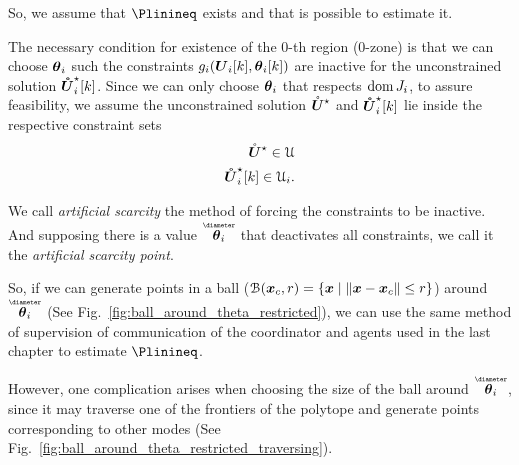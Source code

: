 \documentclass[../main.tex]{subfiles}
\begin{document}
So, we assume that $\Plinineq$ exists and that is possible to estimate it.

The necessary condition for existence of the $0$-th region ($0$-zone) is that we can choose $\boldsymbol{\theta}_{i}$ such the constraints $\inequalityfunction$ are inactive for the unconstrained solution $\optuncUik$.
Since we can only choose $\boldsymbol{\theta}_{i}$ that respects $\operatorname{dom} J_{i}$, to assure feasibility, we assume the unconstrained solution ${\mathring{\boldsymbol{U}}^{\star}}$ and $\optuncUik$ lie inside
the respective constraint sets
\begin{align}
  \optuncU\in\set{U}\\
  \optuncUik\in\set{U}_{i}.
\end{align}


We call \emph{artificial scarcity} the method of forcing the constraints to be inactive.
And supposing there is a value $\thetairestricted$ that deactivates all constraints, we call it the \emph{artificial scarcity point}.

So, if we can generate points in a ball ($\mathcal{B}(\boldsymbol{x}_{c},r)=\{\boldsymbol{x}\mid\left\lVert\boldsymbol{x}-\boldsymbol{x}_{c}\right\rVert\leq r\}$) around $\thetairestricted$ (See Fig.~\ref{fig:ball_around_theta_restricted}), we can use the same method of supervision of communication of the coordinator and agents used in the last chapter to estimate $\Plinineq$.

However, one complication arises when choosing the size of the ball around $\thetairestricted$, since it may traverse one of the frontiers of the polytope and generate points corresponding to other modes (See Fig.~\ref{fig:ball_around_theta_restricted_traversing}).
\end{document}
